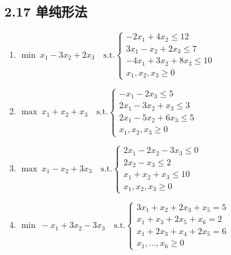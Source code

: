\documentclass{article}
\begin{document}
\subsection*{2.17 单纯形法}
\begin{enumerate}
    \item $\min\ x_1 - 3x_2 + 2x_3 \quad \text{s.t.} \begin{cases} -2x_1 + 4x_2 \le 12 \\ 3x_1 - x_2 + 2x_3 \le 7 \\ -4x_1 + 3x_2 + 8x_3 \le 10 \\ x_1, x_2, x_3 \ge 0 \end{cases}$
    \item $\max\ x_1 + x_2 + x_3 \quad \text{s.t.} \begin{cases} -x_1 - 2x_3 \le 5 \\ 2x_1 - 3x_2 + x_3 \le 3 \\ 2x_1 - 5x_2 + 6x_3 \le 5 \\ x_1, x_2, x_3 \ge 0 \end{cases}$
    \item $\max\ x_1 - x_2 + 3x_3 \quad \text{s.t.} \begin{cases} 2x_1 - 2x_2 - 3x_3 \le 0 \\ 2x_2 - x_3 \le 2 \\ x_1 + x_2 + x_3 \le 10 \\ x_1, x_2, x_3 \ge 0 \end{cases}$
    \item $\min\ -x_1 + 3x_2 - 3x_3 \quad \text{s.t.} \begin{cases} 3x_1 + x_2 + 2x_3 + x_5 = 5 \\ x_1 + x_3 + 2x_5 + x_6 = 2 \\ x_1 + 2x_3 + x_4 + 2x_5 = 6 \\ x_1, \dots, x_6 \ge 0 \end{cases}$
\end{enumerate}
\end{document}

